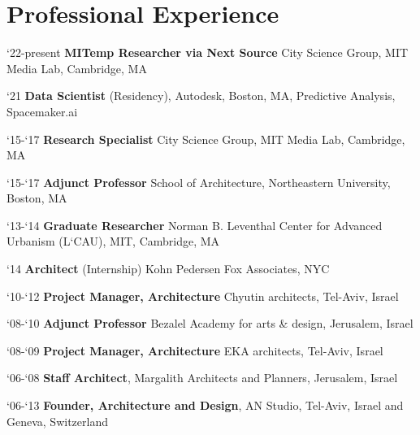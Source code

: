 \section*{Professional Experience}

\begin{tablist}
   \item[`22-present]\tab\textbf{MITemp Researcher via Next Source}
   City Science Group, MIT Media Lab, Cambridge, MA

   \item[`21]\tab\textbf{Data Scientist} (Residency),
   Autodesk, Boston, MA, Predictive Analysis, Spacemaker.ai

    \item[`15-`17]\tab\textbf{Research Specialist}
   City Science Group, MIT Media Lab, Cambridge, MA

   \item[`15-`17]\tab\textbf{Adjunct Professor}
   School of Architecture, Northeastern University, Boston, MA

   \item[`13-`14]\tab\textbf{Graduate Researcher}
   Norman B. Leventhal Center for Advanced Urbanism (L`CAU), MIT, Cambridge, MA

   \item[`14]\tab\textbf{Architect} (Internship)
   Kohn Pedersen Fox Associates, NYC

   \item[`10-`12]\tab
   \textbf{Project Manager, Architecture} Chyutin architects, Tel-Aviv, Israel

   \item[`08-`10]\tab\textbf{Adjunct Professor}
   Bezalel Academy for arts \& design, Jerusalem, Israel

   \item[`08-`09]\tab\textbf{Project Manager, Architecture}
   EKA architects, Tel-Aviv, Israel

   \item[`06-`08]\tab\textbf{Staff Architect},
   Margalith Architects and Planners, Jerusalem, Israel

   \item[`06-`13]\tab
   \textbf{Founder, Architecture and Design},
   AN Studio, Tel-Aviv, Israel and Geneva, Switzerland
\end{tablist}
